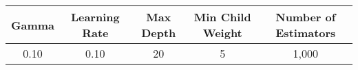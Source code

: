 \footnotesize
\begin{tabular}{ccccc}
\toprule
Gamma & Learning Rate & Max Depth & Min Child Weight & Number of Estimators \\
\midrule
0.10 & 0.10 & 20 & 5 & 1,000 \\
\bottomrule
\end{tabular}

\normalsize